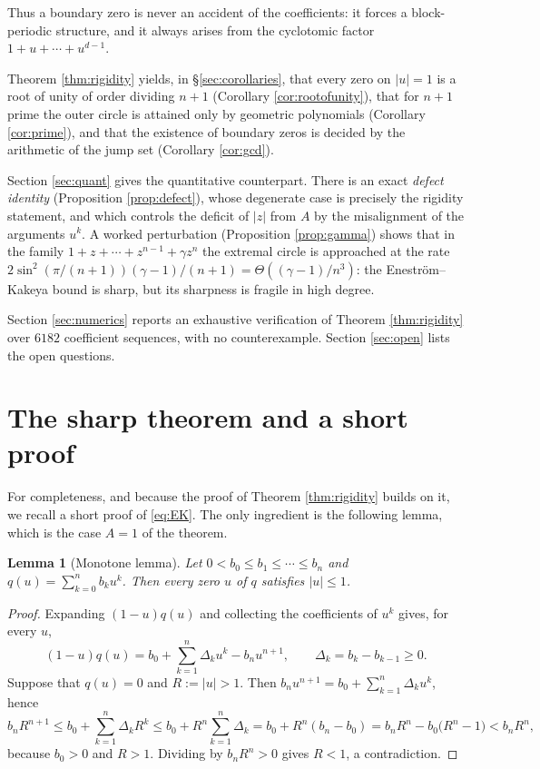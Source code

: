 \documentclass[11pt]{amsart}
\theoremstyle{plain}
\newtheorem{lemma}[theorem]{Lemma}
\theoremstyle{definition}
\theoremstyle{remark}
\newcommand{\abs}[1]{\lvert #1\rvert}
\begin{document}
Thus a boundary zero is never an accident of the coefficients: it forces a block-periodic
structure, and it always arises from the cyclotomic factor $1+u+\cdots+u^{d-1}$.

Theorem \ref{thm:rigidity} yields, in \S\ref{sec:corollaries}, that every zero on
$\abs{u}=1$ is a root of unity of order dividing $n+1$ (Corollary \ref{cor:rootofunity}),
that for $n+1$ prime the outer circle is attained only by geometric polynomials
(Corollary \ref{cor:prime}), and that the existence of boundary zeros is decided by the
arithmetic of the jump set (Corollary \ref{cor:gcd}).

Section \ref{sec:quant} gives the quantitative counterpart. There is an exact
\emph{defect identity} (Proposition \ref{prop:defect}), whose degenerate case is precisely
the rigidity statement, and which controls the deficit of $\abs{z}$ from $A$ by the
misalignment of the arguments $u^{k}$. A worked perturbation
(Proposition \ref{prop:gamma}) shows that in the family $1+z+\cdots+z^{n-1}+\gamma z^{n}$
the extremal circle is approached at the rate
$2\sin^{2}(\pi/(n+1))(\gamma-1)/(n+1)=\Theta((\gamma-1)/n^{3})$: the Enestr\"om--Kakeya
bound is sharp, but its sharpness is fragile in high degree.

Section \ref{sec:numerics} reports an exhaustive verification of
Theorem \ref{thm:rigidity} over $6182$ coefficient sequences, with no counterexample.
Section \ref{sec:open} lists the open questions.

\section{The sharp theorem and a short proof}\label{sec:EK}

For completeness, and because the proof of Theorem \ref{thm:rigidity} builds on it, we
recall a short proof of \eqref{eq:EK}. The only ingredient is the following lemma, which is
the case $A=1$ of the theorem.

\begin{lemma}[Monotone lemma]\label{lem:monotone}
Let $0<b_0\le b_1\le\cdots\le b_n$ and $q(u)=\sum_{k=0}^{n}b_ku^{k}$. Then every zero $u$
of $q$ satisfies $\abs{u}\le1$.
\end{lemma}

\begin{proof}
Expanding $(1-u)q(u)$ and collecting the coefficients of $u^{k}$ gives, for every $u$,
\[
(1-u)q(u)=b_0+\sum_{k=1}^{n}\Delta_ku^{k}-b_nu^{n+1},
\qquad \Delta_k=b_k-b_{k-1}\ge0 .
\]
Suppose that $q(u)=0$ and $R:=\abs{u}>1$. Then
$b_nu^{n+1}=b_0+\sum_{k=1}^{n}\Delta_ku^{k}$, hence
\[
b_nR^{n+1}\le b_0+\sum_{k=1}^{n}\Delta_kR^{k}
\le b_0+R^{n}\sum_{k=1}^{n}\Delta_k
=b_0+R^{n}(b_n-b_0)
=b_nR^{n}-b_0\bigl(R^{n}-1\bigr)
<b_nR^{n},
\]
because $b_0>0$ and $R>1$. Dividing by $b_nR^{n}>0$ gives $R<1$, a contradiction.
\end{proof}
\end{document}
